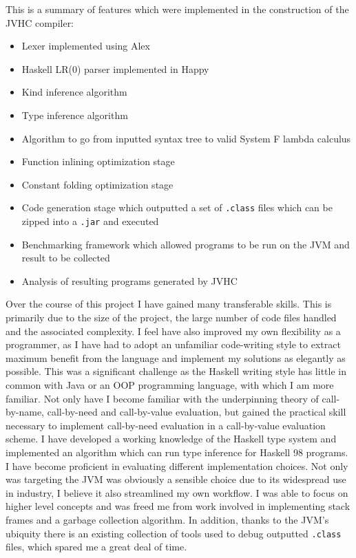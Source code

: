 \documentclass[float=false, crop=false]{standalone}
\begin{document}
This is a summary of features which were implemented in the construction
of the JVHC compiler:

\begin{itemize}

  \item Lexer implemented using Alex

  \item Haskell LR(0) parser implemented in Happy

  \item Kind inference algorithm

  \item Type inference algorithm

  \item Algorithm to go from inputted syntax tree to valid
    System F lambda calculus

  \item Function inlining optimization stage

  \item Constant folding optimization stage

  \item Code generation stage which outputted a set of \verb|.class|
    files which can be zipped into a \verb|.jar| and executed

  \item Benchmarking framework which allowed programs to be run on the JVM and 
    result to be collected

  \item Analysis of resulting programs generated by JVHC
\end{itemize}
Over the course of this project I have gained many transferable
skills. This is primarily due to the size of the project, the large number of code files handled and the associated complexity. I feel have also improved my own flexibility as a programmer, as I have had to adopt an unfamiliar code-writing style to extract maximum benefit from the language and implement my solutions as elegantly as possible.
This was a significant challenge as the Haskell writing style has little in common with Java or an OOP
programming language, with which I am more familiar. Not only have I become familiar with the underpinning theory of call-by-name, call-by-need and 
call-by-value evaluation, but gained the practical skill necessary to implement call-by-need evaluation
in a call-by-value evaluation scheme. I have developed a working knowledge of the Haskell
type system and implemented an algorithm which can run type inference
for Haskell 98 programs. I have become proficient in evaluating different implementation
choices. Not only was targeting the JVM was obviously a sensible choice due to its widespread use in industry, I believe it also streamlined my own workflow. I was able to focus on higher level concepts and was freed me from work involved in 
implementing stack frames and a garbage collection algorithm. 
In addition, thanks to the JVM’s ubiquity there is an existing collection of tools 
used to debug outputted \verb|.class| files, which spared me a great deal of time. 
\end{document}
